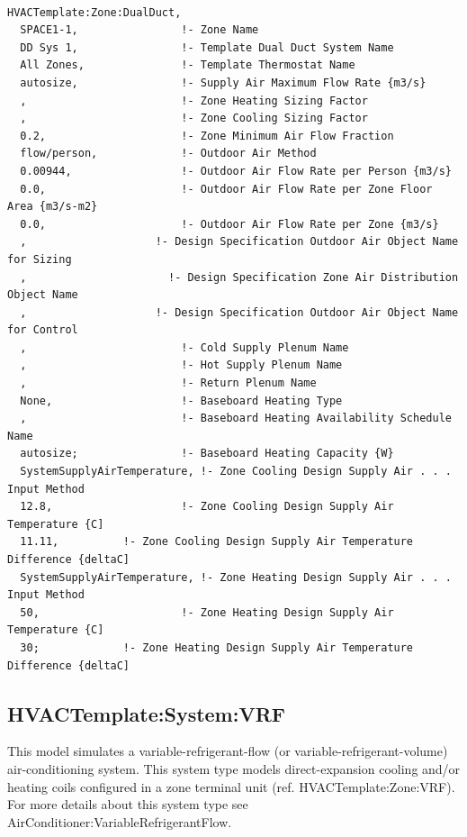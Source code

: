 \begin{lstlisting}

HVACTemplate:Zone:DualDuct,
  SPACE1-1,                !- Zone Name
  DD Sys 1,                !- Template Dual Duct System Name
  All Zones,               !- Template Thermostat Name
  autosize,                !- Supply Air Maximum Flow Rate {m3/s}
  ,                        !- Zone Heating Sizing Factor
  ,                        !- Zone Cooling Sizing Factor
  0.2,                     !- Zone Minimum Air Flow Fraction
  flow/person,             !- Outdoor Air Method
  0.00944,                 !- Outdoor Air Flow Rate per Person {m3/s}
  0.0,                     !- Outdoor Air Flow Rate per Zone Floor Area {m3/s-m2}
  0.0,                     !- Outdoor Air Flow Rate per Zone {m3/s}
  ,                    !- Design Specification Outdoor Air Object Name for Sizing
  ,                      !- Design Specification Zone Air Distribution Object Name
  ,                    !- Design Specification Outdoor Air Object Name for Control
  ,                        !- Cold Supply Plenum Name
  ,                        !- Hot Supply Plenum Name
  ,                        !- Return Plenum Name
  None,                    !- Baseboard Heating Type
  ,                        !- Baseboard Heating Availability Schedule Name
  autosize;                !- Baseboard Heating Capacity {W}
  SystemSupplyAirTemperature, !- Zone Cooling Design Supply Air . . . Input Method
  12.8,                    !- Zone Cooling Design Supply Air Temperature {C]
  11.11,          !- Zone Cooling Design Supply Air Temperature Difference {deltaC]
  SystemSupplyAirTemperature, !- Zone Heating Design Supply Air . . . Input Method
  50,                      !- Zone Heating Design Supply Air Temperature {C]
  30;             !- Zone Heating Design Supply Air Temperature Difference {deltaC]
\end{lstlisting}

\subsection{HVACTemplate:System:VRF}\label{hvactemplatesystemvrf}

This model simulates a variable-refrigerant-flow (or variable-refrigerant-volume) air-conditioning system. This system type models direct-expansion cooling and/or heating coils configured in a zone terminal unit (ref. HVACTemplate:Zone:VRF). For more details about this system type see AirConditioner:VariableRefrigerantFlow.

